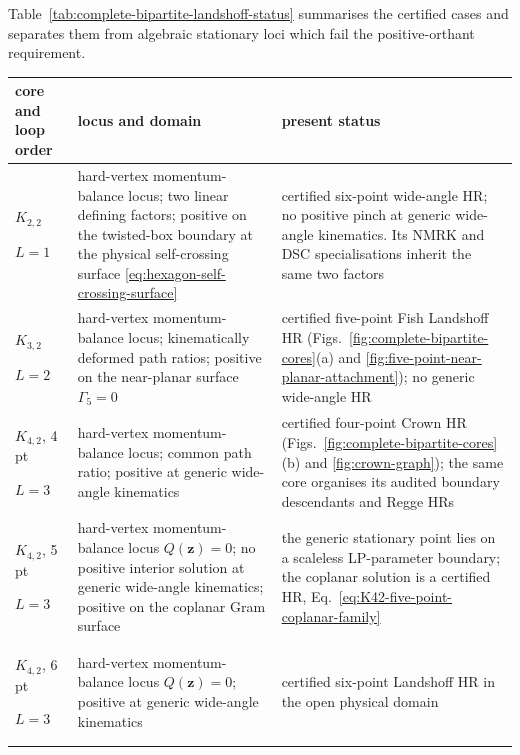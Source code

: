 \documentclass[a4paper,11pt]{article}
\begin{document}
Table~\ref{tab:complete-bipartite-landshoff-status} summarises the certified
cases and separates them from algebraic stationary loci which fail the
positive-orthant requirement.
\begin{table}[H]
\centering
\small
\begin{tabular}{@{}
 >{\centering\arraybackslash}p{}
 >{\raggedright\arraybackslash}p{}
 >{\raggedright\arraybackslash}p{}@{}}
\toprule
core and loop order & locus and domain & present status\\
\midrule
\(K_{2,2}\)\par{\scriptsize \(L=1\)}
& hard-vertex momentum-balance locus; two linear defining factors; positive
  on the twisted-box boundary at the physical self-crossing surface
  \eqref{eq:hexagon-self-crossing-surface}
& certified six-point wide-angle HR; no positive pinch at generic wide-angle
  kinematics.  Its NMRK and DSC specialisations inherit the same two
  factors\\\addlinespace[3pt]
\(K_{3,2}\)\par{\scriptsize \(L=2\)}
& hard-vertex momentum-balance locus; kinematically deformed path ratios;
  positive on the near-planar surface \(\Gamma_5=0\)
& certified five-point Fish Landshoff HR
  (Figs.~\ref{fig:complete-bipartite-cores}(a) and
  \ref{fig:five-point-near-planar-attachment}); no generic wide-angle
  HR\\\addlinespace[3pt]
\(K_{4,2}\), 4 pt\par{\scriptsize \(L=3\)}
& hard-vertex momentum-balance locus; common path ratio; positive at generic
  wide-angle kinematics
& certified four-point Crown HR
  (Figs.~\ref{fig:complete-bipartite-cores}(b) and
  \ref{fig:crown-graph}); the same core organises its
  audited boundary descendants and Regge HRs\\\addlinespace[3pt]
\(K_{4,2}\), 5 pt\par{\scriptsize \(L=3\)}
& hard-vertex momentum-balance locus \(Q(\boldsymbol z)=0\); no positive
  interior solution at generic wide-angle kinematics; positive on the
  coplanar Gram surface
& the generic stationary point lies on a scaleless LP-parameter boundary;
  the coplanar solution is a certified HR,
  Eq.~\eqref{eq:K42-five-point-coplanar-family}\\\addlinespace[3pt]
\(K_{4,2}\), 6 pt\par{\scriptsize \(L=3\)}
& hard-vertex momentum-balance locus \(Q(\boldsymbol z)=0\); positive at
  generic wide-angle kinematics
& certified six-point Landshoff HR in the open physical domain

\end{tabular}
\end{table}
\end{document}
